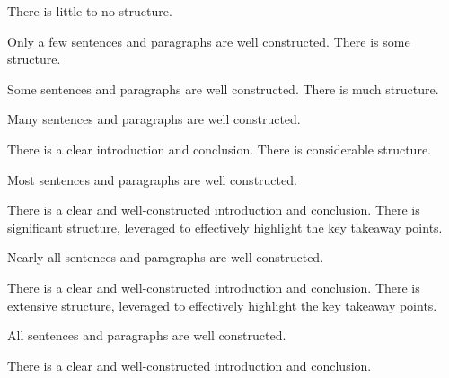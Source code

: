 \documentclass{../fal_assignment}
\begin{document}
\begin{markingrubric}
%
        \grade \fail	There is little to no structure.
        \par 		Only a few sentences and paragraphs are well constructed.
        \grade 		There is some structure.
        \par 		Some sentences and paragraphs are well constructed.
        \grade 		There is much structure.
        \par 		Many sentences and paragraphs are well constructed.
        \par 		There is a clear introduction and conclusion.
        \grade 		There is considerable structure.
        \par 		Most sentences and paragraphs are well constructed.
        \par 		There is a clear and well-constructed introduction and conclusion.
        \grade 		There is significant structure, leveraged to effectively highlight the key takeaway points.
        \par 		Nearly all sentences and paragraphs are well constructed.
        \par 		There is a clear and well-constructed introduction and conclusion.
        \grade 		There is extensive structure, leveraged to effectively highlight the key takeaway points.
        \par 		All sentences and paragraphs are well constructed.
        \par 		There is a clear and well-constructed introduction and conclusion.
\end{markingrubric}
\end{document}
